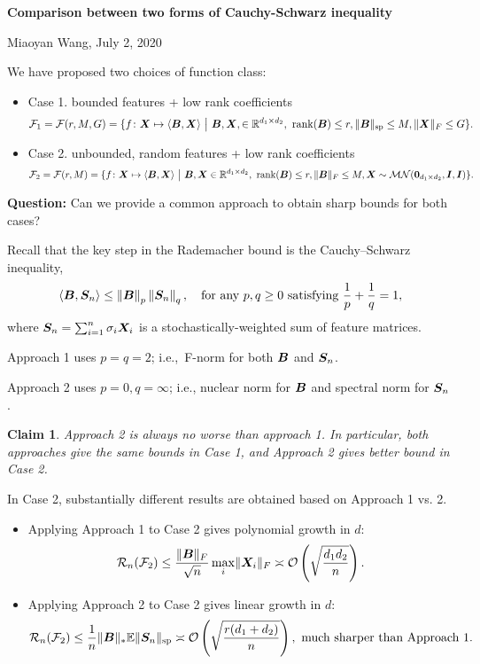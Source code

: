 \documentclass[11pt]{article}
\theoremstyle{plain}
\newtheorem{claim}{Claim}
\theoremstyle{definition}
\newcommand{\newnorm}[1]{\left\lVert#1\right\rVert}
\begin{document}
\begin{center}
{\Large \bf Comparison between two forms of Cauchy-Schwarz inequality}

Miaoyan Wang, July 2, 2020
\end{center}

We have proposed two choices of function class:
\begin{itemize}[leftmargin=-1pt]
\item[] Case 1. bounded features + low rank coefficients
\[
\tF_1=\tF(r,M, G)=\{f\colon \mX\mapsto \langle \mB, \mX\rangle\ \big| \ \mB,\mX,\in\mathbb{R}^{d_1\times d_2},\ \text{rank}(\mB)\leq r, \snormSize{}{\mB}\leq M, \FnormSize{}{\mX}\leq G\}.
\]
\item[] Case 2. unbounded, random features + low rank coefficients
\[
\tF_2=\tF(r,M)=\{f\colon \mX\mapsto \langle \mB, \mX\rangle\ \big| \ \mB, \mX\in\mathbb{R}^{d_1\times d_2},\ \text{rank}(\mB)\leq r, \FnormSize{}{\mB}\leq M, \mX\sim \tM\tN(\mathbf{0}_{d_1\times d_2}, \mI, \mI)\}.
\]
\end{itemize}
{\bf Question:} Can we provide a common approach to obtain sharp bounds for both cases? 

Recall that the key step in the Rademacher bound is the Cauchy–Schwarz inequality,
\[
\langle \mB, \mS_n \rangle \leq \newnorm{\mB}_p \newnorm{\mS_n}_q, \quad \text{for any $p,q\geq 0$ satisfying ${1\over p} + {1\over q}=1$},
\]
where $\bm S_n=\sum_{i=1}^n \sigma_i\bm X_i$ is a stochastically-weighted sum of feature matrices.  

Approach 1 uses $p=q=2$; i.e.,\ F-norm for both $\bm B$ and $\bm S_n$. 

Approach 2 uses $p=0, q=\infty$; i.e., nuclear norm for $\bm B$ and spectral norm for $\bm S_n$. \\

\begin{claim}
Approach 2 is always no worse than approach 1. In particular, both approaches give the same bounds in Case 1, and Approach 2 gives better bound in Case 2. 
\end{claim}

In Case 2, substantially different results are obtained based on Approach 1 vs. 2.
\begin{itemize}
\item Applying Approach 1 to Case 2 gives polynomial growth in $d$:
\[
\mathcal{R}_n(\mathcal{F}_2)\leq {\lVert\bm B\rVert_F \over \sqrt{n} } \max_i\lVert\bm X_i\rVert_F \asymp \mathcal{O}\left(\sqrt{d_1d_2\over n}\right).
\]
\item Applying Approach 2 to Case 2 gives linear growth in $d$:
\[
\mathcal{R}_n(\mathcal{F}_2) \leq {1\over n}\lVert\bm B\rVert_*\mathbb{E}\lVert\bm S_n\rVert_\text{sp} \asymp \mathcal{O}\left(\sqrt{r(d_1+d_2)\over n}\right), \ \text{much sharper than Approach 1.}
\]
\end{itemize}
\end{document}
